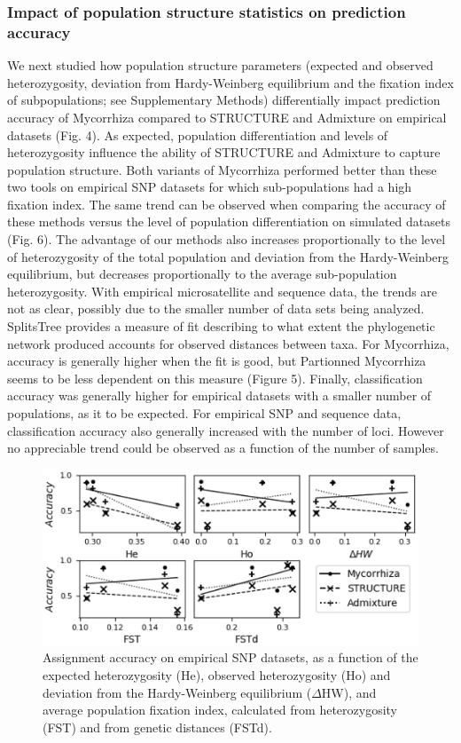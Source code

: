 \documentclass[final]{bioinfo}
\begin{document}
\subsubsection{Impact of population structure statistics on prediction accuracy}
We next studied how population structure parameters (expected and observed heterozygosity, deviation from Hardy-Weinberg equilibrium and the fixation index of subpopulations; see Supplementary Methods) differentially impact prediction accuracy of Mycorrhiza compared to STRUCTURE and Admixture on empirical datasets (Fig. 4). As expected, population differentiation and levels of heterozygosity influence the ability of STRUCTURE and Admixture to capture population structure. Both variants of Mycorrhiza performed better than these two tools on empirical SNP datasets for which sub-populations had a high fixation index. The same trend can be observed when comparing the accuracy of these methods versus the level of population differentiation on simulated datasets (Fig. 6). The advantage of our methods  also increases proportionally to the level of heterozygosity of the total population and deviation from the Hardy-Weinberg equilibrium, but decreases proportionally to the average sub-population heterozygosity. With empirical microsatellite and sequence data, the trends are not as clear, possibly due to the smaller number of data sets being analyzed. SplitsTree provides a measure of fit describing to what extent the phylogenetic network produced accounts for observed distances between taxa. For Mycorrhiza, accuracy is generally higher when the fit is good, but Partionned Mycorrhiza seems to be less dependent on this measure (Figure 5). Finally, classification accuracy was generally higher for empirical datasets with a smaller number of populations, as it to be expected. For empirical SNP and sequence data, classification accuracy also generally increased with the number of loci. However no appreciable trend could be observed as a function of the number of samples.
\begin{figure}[!tbp]%
    \includegraphics[width=\linewidth]{figure4.eps}
    \caption{Assignment accuracy on empirical SNP datasets, as a function of the expected heterozygosity (He), observed heterozygosity (Ho) and deviation from the Hardy-Weinberg equilibrium ($\Delta$HW), and average population fixation index, calculated from heterozygosity (FST) and from genetic distances (FSTd).}\label{fig:04}
\end{figure}
\end{document}
